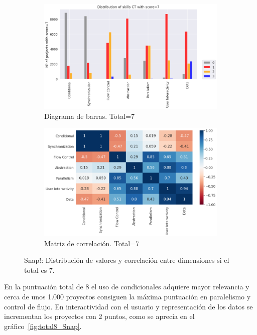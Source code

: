 \documentclass[a4paper, 12pt]{book}
\begin{document}
\begin{figure}[H]
    \centering
    \begin{subfigure}[h]{.49\textwidth} 
        \includegraphics[width=\textwidth]{img/distribucion_7_Snap}
        \caption{Diagrama de barras. Total=7}
        \label{fig:total7_Snap}
    \end{subfigure}       
    \begin{subfigure}[h]{.49\textwidth} 
        \includegraphics[width=\textwidth]{img/corr_7_Snap}
        \caption{Matriz de correlación. Total=7}
        \label{fig:corr7_Snap}
    \end{subfigure}
    \caption{Snap!: Distribución de valores y correlación entre dimensiones si el total es 7.}
\end{figure}

En la puntuación total de 8 el uso de condicionales adquiere mayor relevancia y cerca de unos 1.000 proyectos consiguen la máxima puntuación en paralelismo y control de flujo. En interactividad con el usuario y representación de los datos se incrementan los proyectos con 2 puntos, como se aprecia en el gráfico~\ref{fig:total8_Snap}.
\end{document}
